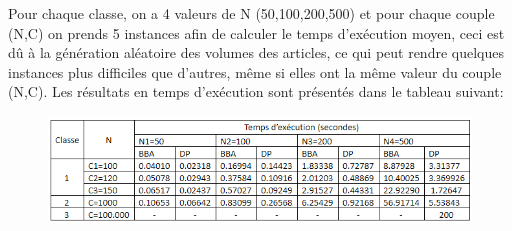 \documentclass[12pt]{article}
\begin{document}
Pour chaque classe, on a 4 valeurs de N (50,100,200,500) et pour chaque couple (N,C) on prends 5 instances afin de calculer le temps d'exécution moyen, ceci est dû à la génération aléatoire des volumes des articles, ce qui peut rendre quelques instances plus difficiles que d’autres, même si elles ont la même valeur du couple (N,C). Les résultats en temps d'exécution sont présentés dans le tableau suivant:
\begin{figure}[H]
    \includegraphics[width=13.5cm]{../figures/tab2.png}
\end{figure}
\end{document}
